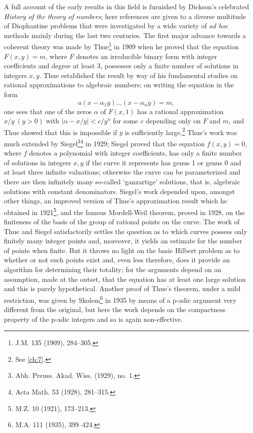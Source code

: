 A full account of the early results in this field is furnished by Dickson's celebrated \textit{History of the theory of numbers}; here references are given to a diverse multitude of Diophantine problems that were investigated by a wide variety of \textit{ad hoc} methods mainly during the last two centuries. The first major advance towards a coherent theory was made by Thue\footnote{J.M. 135 (1909), 284--305.} in 1909 when he proved that the equation $F(x,y) = m$, where $F$ denotes an irreducible binary form with integer coefficients and degree at least 3, possesses only a finite number of solutions in integers $x, y$. Thue established the result by way of his fundamental studies on rational approximations to algebraic numbers; on writing the equation in the form
\[
a(x-\alpha_1 y)\dots(x-\alpha_n y)=m,
\]
one sees that one of the zeros $\alpha$ of $F(x, 1)$ has a rational approximation $x/y \ (y > 0)$ with $|\alpha - x/y| < c/y^n$ for some $c$ depending only on $F$ and $m$, and Thue showed that this is impossible if $y$ is sufficiently large.\footnote{See \autoref{ch:7}.} Thue's work was much extended by Siegel\footnote{Abh. Preuss. Akad. Wiss. (1929), no. 1.}\footnote{Acta Math. 53 (1928), 281--315.} in 1929; Siegel proved that the equation $f(x, y) = 0$, where $f$ denotes a polynomial with integer coefficients, has only a finite number of solutions in integers $x, y$ if the curve it represents has genus 1 or genus 0 and at least three infinite valuations; otherwise the curve can be parameterized and there are then infinitely many so-called `ganzartige' solutions, that is, algebraic solutions with constant denominators. Siegel's work depended upon, amongst other things, an improved version of Thue's approximation result which he obtained in 1921\footnote{M.Z. 10 (1921), 173--213.}, and the famous Mordell-Weil theorem, proved in 1928, on the finiteness of the basis of the group of rational points on the curve. The work of Thue and Siegel satisfactorily settles the question as to which curves possess only finitely many integer points and, moreover, it yields an estimate for the number of points when finite. But it throws no light on the basic Hilbert problem as to whether or not such points exist and, even less therefore, does it provide an algorithm for determining their totality; for the arguments depend on an assumption, made at the outset, that the equation has at least one large solution and this is purely hypothetical. Another proof of Thue's theorem, under a mild restriction, was given by Skolem\footnote{M.A. 111 (1935), 399--424.} in 1935 by means of a p-adic argument very different from the original, but here the work depends on the compactness property of the p-adic integers and so is again non-effective.


